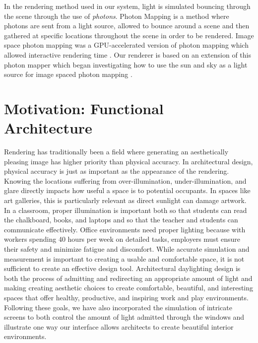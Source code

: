 \documentclass[10pt,twocolumn,letterpaper]{article}
\begin{document}

In the rendering method used in our system, light is simulated
bouncing through the scene through the use of \emph{photons}.  Photon
Mapping is a method where photons are sent from a light source,
allowed to bounce around a scene and then gathered at specific
locations throughout the scene in order to be
rendered\cite{Jensen:1996:GIU:275458.275461}.  Image space photon
mapping was a GPU-accelerated version of photon mapping which allowed
interactive rendering time \cite{mcguire09imagespace}.  Our renderer
is based on an extension of this photon mapper which began
investigating how to use the sun and sky as a light source for image
spaced photon mapping \cite{ericli}.



\section{Motivation: Functional Architecture}

Rendering has traditionally been a field where generating an
aesthetically pleasing image has higher priority than
physical accuracy.  In architectural design, physical accuracy is just
as important as the appearance of the rendering.  Knowing the
locations suffering from over-illumination, under-illumination, and
glare directly impacts how useful a space is to potential occupants.
In spaces like art galleries, this is particularly relevant as direct
sunlight can damage artwork.  In a classroom, proper illumination is
important both so that students can read the chalkboard, books, and
laptops and so that the teacher and students can communicate
effectively.  Office environments need proper lighting because with
workers spending 40 hours per week on detailed tasks, employers must
ensure their safety and minimize fatigue and discomfort.  While
accurate simulation and measurement is important to creating a usable
and comfortable space, it is not sufficient to create an effective
design tool.  Architectural daylighting design is both the process of
admitting and redirecting an appropriate amount of light and making
creating aesthetic choices to create comfortable, beautiful, and
interesting spaces that offer healthy, productive, and inspiring work
and play environments.  Following these goals, we have also
incorporated the simulation of intricate screens to both control the
amount of light admitted through the windows and illustrate one way
our interface allows architects to create beautiful interior
environments.
\end{document}
